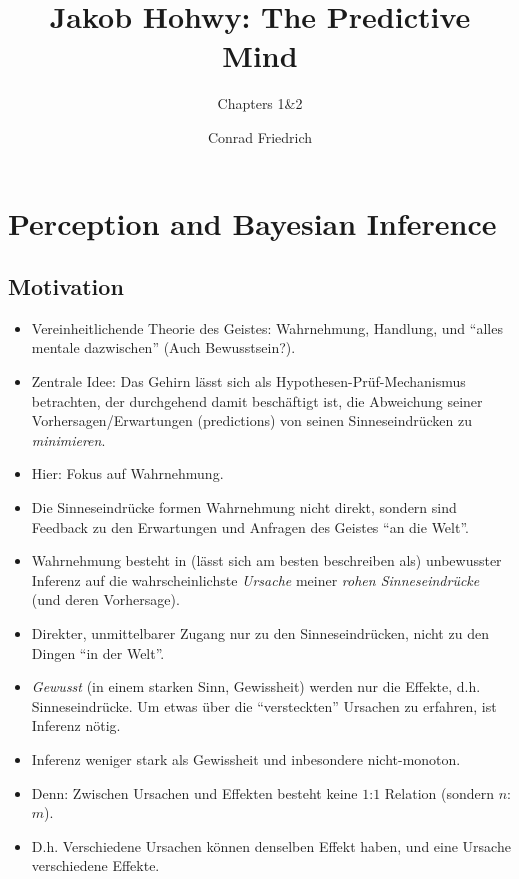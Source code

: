 \documentclass[12pt, handout]{beamer}
\title[The Predictive Mind]{Jakob Hohwy: The Predictive Mind}
\subtitle{Chapters 1\&2}
\author{Conrad Friedrich}
\institute[Uni Köln]{Universität zu Köln}
\begin{document}
\begin{frame}[plain]
  \maketitle
\end{frame}

\section{Perception and Bayesian Inference}

\subsection{Motivation}

\begin{frame}
  \begin{itemize}[<+->]
  \item Vereinheitlichende Theorie des Geistes: Wahrnehmung, Handlung,
    und ``alles mentale dazwischen'' (Auch Bewusstsein?).
  \item Zentrale Idee: Das Gehirn lässt sich als
    Hypothesen-Prüf-Mechanismus betrachten, der durchgehend damit
    beschäftigt ist, die Abweichung seiner Vorhersagen/Erwartungen
    (predictions) von seinen Sinneseindrücken zu \emph{minimieren}.
  \item Hier: Fokus auf Wahrnehmung.
  \item Die Sinneseindrücke formen Wahrnehmung nicht direkt, sondern
    sind Feedback zu den Erwartungen und Anfragen des Geistes ``an die
    Welt''.
  \end{itemize}
\end{frame}

\begin{frame}
  \begin{itemize}[<+->]
  \item Wahrnehmung besteht in (lässt sich am besten beschreiben als)
    unbewusster Inferenz auf die wahrscheinlichste \emph{Ursache}
    meiner \emph{rohen Sinneseindrücke} (und deren Vorhersage).
  \item Direkter, unmittelbarer Zugang nur zu den Sinneseindrücken,
    nicht zu den Dingen ``in der Welt''.
  \item \emph{Gewusst} (in einem starken Sinn, Gewissheit) werden nur
    die Effekte, d.h. Sinneseindrücke. Um etwas über die
    ``versteckten'' Ursachen zu erfahren, ist Inferenz nötig.
  \item Inferenz weniger stark als Gewissheit und inbesondere
    nicht-monoton.
  \item Denn: Zwischen Ursachen und Effekten besteht keine $1$:$1$
    Relation (sondern $n$:$m$).
  \item D.h. Verschiedene Ursachen können denselben Effekt haben, und
    eine Ursache verschiedene Effekte.
  \end{itemize}
\end{frame}
\end{document}
